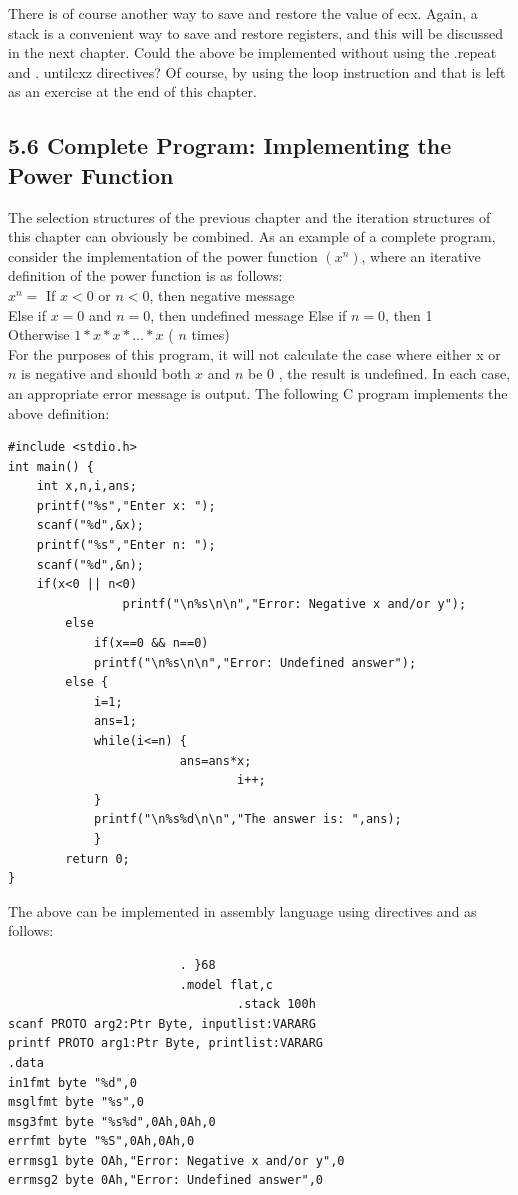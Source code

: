 \documentclass[10pt]{book}
\begin{document}
There is of course another way to save and restore the value of ecx. Again, a stack is a convenient way to save and restore registers, and this will be discussed in the next chapter. Could the above be implemented without using the .repeat and . untilcxz directives? Of course, by using the loop instruction and that is left as an exercise at the end of this chapter.

\subsection*{5.6 Complete Program: Implementing the Power Function}
The selection structures of the previous chapter and the iteration structures of this chapter can obviously be combined. As an example of a complete program, consider the implementation of the power function $\left(x^{n}\right)$, where an iterative definition of the power function is as follows:\\
$x^{n}=$ If $x<0$ or $n<0$, then negative message\\
Else if $x=0$ and $n=0$, then undefined message Else if $n=0$, then 1\\
Otherwise $1 * x * x * \ldots * x$ ( $n$ times)\\
For the purposes of this program, it will not calculate the case where either x or $n$ is negative and should both $x$ and $n$ be 0 , the result is undefined. In each case, an appropriate error message is output. The following C program implements the above definition:

\begin{verbatim}
#include <stdio.h>
int main() {
    int x,n,i,ans;
    printf("%s","Enter x: ");
    scanf("%d",&x);
    printf("%s","Enter n: ");
    scanf("%d",&n);
    if(x<0 || n<0)
                printf("\n%s\n\n","Error: Negative x and/or y");
        else
            if(x==0 && n==0)
            printf("\n%s\n\n","Error: Undefined answer");
        else {
            i=1;
            ans=1;
            while(i<=n) {
                        ans=ans*x;
                                i++;
            }
            printf("\n%s%d\n\n","The answer is: ",ans);
            }
        return 0;
}
\end{verbatim}

The above can be implemented in assembly language using directives and as follows:


\begin{verbatim}
                        . }68
                        .model flat,c
                                .stack 100h
scanf PROTO arg2:Ptr Byte, inputlist:VARARG
printf PROTO arg1:Ptr Byte, printlist:VARARG
.data
in1fmt byte "%d",0
msglfmt byte "%s",0
msg3fmt byte "%s%d",0Ah,0Ah,0
errfmt byte "%S",0Ah,0Ah,0
errmsg1 byte OAh,"Error: Negative x and/or y",0
errmsg2 byte 0Ah,"Error: Undefined answer",0
\end{verbatim}
\end{document}
